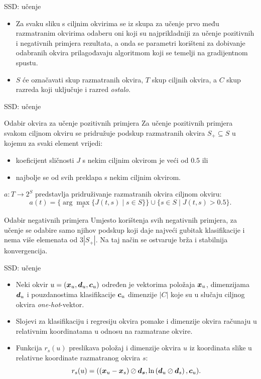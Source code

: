 \documentclass{beamer}
\begin{document}
\begin{frame}{SSD: učenje}
	\begin{itemize}
		\item Za svaku sliku s ciljnim okvirima se iz skupa za učenje prvo među razmatranim okvirima odaberu oni koji su najprikladniji za učenje pozitivnih i negativnih primjera rezultata, a onda se parametri korišteni za dobivanje odabranih okvira prilagođavaju algoritmom koji se temelji na gradijentnom spustu.
		\item $S$ će označavati skup razmatranih okvira, $T$ skup ciljnih okvira, a $C$ skup razreda koji uključuje i razred \emph{ostalo}.
	\end{itemize}
\end{frame}

\begin{frame}{SSD: učenje}
	\begin{block}{Odabir okvira za učenje pozitivnih primjera}
		Za učenje pozitivnih primjera svakom ciljnom okviru se pridružuje podskup razmatranih okvira $S_+ \subseteq S$ u kojemu za svaki element vrijedi:
		\begin{itemize}
			\item koeficijent sličnosti $J$ s nekim ciljnim okvirom je veći od $0.5$ ili
			\item najbolje se od svih preklapa s nekim ciljnim okvirom.		
		\end{itemize}
		$a\colon T\to 2^S$ predstavlja pridruživanje razmatranih okvira ciljnom okviru:
		$$
		a(t) = \{\arg\!\max_s \{ J(t,s) \mid s\in S\}\} \cup \{s\in S\mid J(t,s) > 0.5 \}.
		$$
	\end{block}
	\begin{block}{Odabir negativnih primjera}
		Umjesto korištenja svih negativnih primjera, za učenje se odabire samo njihov podskup koji daje najveći gubitak  klasifikacije i nema više elemenata od $3\left|S_+\right|$. Na taj način se ostvaruje brža i stabilnija konvergencija.
	\end{block}
\end{frame}

\begin{frame}{SSD: učenje}
	\begin{itemize}
		\item Neki okvir $u=(\bm{x}_u, \bm{d}_u, \bm{c}_u)$ određen je vektorima položaja $\bm{x}_u$, dimenzijama $\bm{d}_u$ i pouzdanostima klasifikacije $\bm{c}_u$ dimenzije $\left|C\right|$ koje su u slučaju ciljnog okvira \emph{one-hot}-vektor.
		\item Slojevi za klasifikaciju i regresiju okvira pomake i dimenzije okvira računaju u relativnim koordinatama u odnosu na razmatrane okvire. 
		\item Funkcija $r_s(u)$ preslikava položaj i dimenzije okvira $u$ iz koordinata slike u relativne koordinate razmatranog okvira $s$: 
		$$
			r_s(u) = ((\bm{x}_u-\bm{x}_{s})\oslash\bm{d_s}, \ln\left(\bm{d}_u\oslash\bm{d}_s\right), \bm{c}_u).
		$$
	\end{itemize}
\end{frame}
\end{document}
